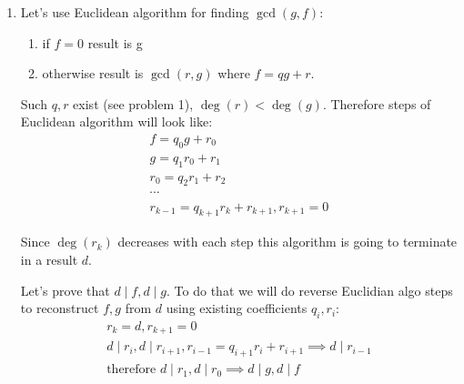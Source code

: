 \documentclass[12pt]{article}
\begin{document}
\begin{enumerate}
        For uniqueness assume that $\exists q', r' \colon q \neq q' \text{ or } r \neq r', f=q'g +r'$.
        \[
        \begin{gathered}
          f = qg + r, f = q'g + r' \\
          qg + r - (q'g + r') = 0 \\
          (q - q')g + (r - r') = 0 \\
          \deg(r) < \deg(g), \deg(r') < \deg(g) \implies \deg(r - r') < \deg(g) \implies \deg(r'-r) < \deg(g)
        \end{gathered}
        \]

        Consider two cases:
        \[
        q=q' \implies r=r'
        \]
        contradiction with initial assumption

        \[
        \begin{gathered}
          q \neq q' \implies \deg(q - q') \geq 0 \implies \deg((q - q')g) \geq \deg(g) \\
          (q - q')g = r'-r \implies \deg((q-q')g) = \deg(r'-r)
        \end{gathered}
        \]
        which is a contradiction since $LHS \geq \deg(g), RHS < \deg(g)$, therefore $q'=q, r'=r$.
  \item
        Let's use Euclidean algorithm for finding $\gcd(g, f)$:
        \begin{enumerate}
          \item if $f=0$ result is g
          \item otherwise result is $\gcd(r, g)$ where $f=qg + r$.
        \end{enumerate}

        Such $q, r$ exist (see problem 1), $\deg(r) < \deg(g)$. Therefore steps of Euclidean algorithm will look like:
        \[
        \begin{gathered}
          f=q_0g + r_0 \\
          g=q_1r_0 + r_1 \\
          r_0=q_2r_1 + r_2 \\
          \cdots \\
          r_{k-1}=q_{k+1}r_{k} + r_{k+1}, r_{k+1}=0
        \end{gathered}
        \]

        Since $\deg(r_k)$ decreases with each step this algorithm is going to terminate in a result $d$.

        Let's prove that $d \mid f, d \mid g$. To do that we will do reverse Euclidian algo steps to reconstruct $f, g$ from $d$ using existing coefficients $q_i, r_i$:
        \[
        \begin{gathered}
          r_k=d, r_{k+1}=0 \\
          d \mid r_{i}, d \mid r_{i+1}, r_{i-1}=q_{i+1}r_{i} + r_{i+1} \implies d \mid r_{i-1} \\
          \text{therefore } d \mid r_1, d \mid r_0 \implies d \mid g, d \mid f
        \end{gathered}
        \]


\end{enumerate}
\end{document}
